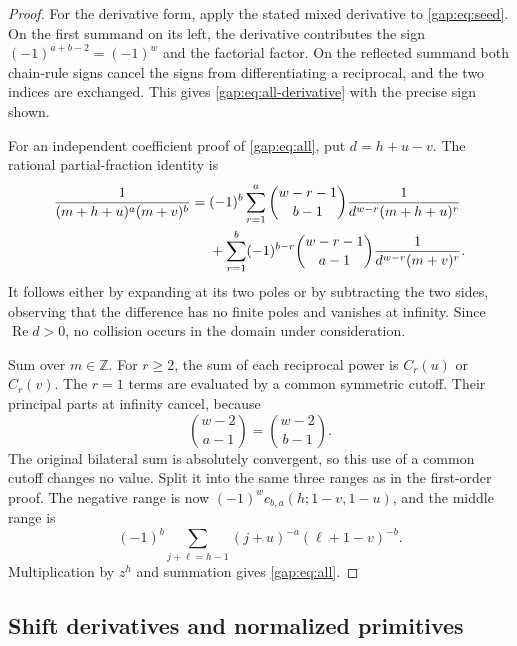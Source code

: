 \documentclass[11pt,letterpaper]{article}
\numberwithin{equation}{section}
\theoremstyle{plain}
\theoremstyle{definition}
\theoremstyle{remark}
\begin{document}
\begin{proof}
For the derivative form, apply the stated mixed derivative to
\eqref{gap:eq:seed}. On the first summand on its left, the derivative
contributes the sign $(-1)^{a+b-2}=(-1)^w$ and the factorial factor.
On the reflected summand both chain-rule signs cancel the signs
from differentiating a reciprocal, and the two indices are exchanged.
This gives \eqref{gap:eq:all-derivative} with the precise sign shown.

For an independent coefficient proof of \eqref{gap:eq:all}, put
$d=h+u-v$. The rational partial-fraction identity is
\begin{align}
 \frac1{(m+h+u)^a(m+v)^b}
 ={}&(-1)^b\sum_{r=1}^{a}
  \binom{w-r-1}{b-1}\frac1{d^{w-r}(m+h+u)^r}\notag\\
 &+\sum_{r=1}^{b}(-1)^{b-r}
  \binom{w-r-1}{a-1}\frac1{d^{w-r}(m+v)^r}.
 \label{gap:eq:pf}
\end{align}
It follows either by expanding at its two poles or by subtracting
the two sides, observing that the difference has no finite poles and
vanishes at infinity. Since $\operatorname{Re}d>0$, no collision occurs
in the domain under consideration.

Sum over $m\in\mathbb Z$. For $r\geq2$, the sum of each reciprocal
power is $C_r(u)$ or $C_r(v)$. The $r=1$ terms are evaluated by a
common symmetric cutoff. Their principal parts at infinity cancel,
because
\[
 \binom{w-2}{a-1}=\binom{w-2}{b-1}.
\]
The original bilateral sum is absolutely convergent, so this use of
a common cutoff changes no value. Split it into the same three ranges
as in the first-order proof. The negative range is now
$(-1)^w c_{b,a}(h;1-v,1-u)$, and the middle range is
\[
 (-1)^b\sum_{j+\ell=h-1}
      (j+u)^{-a}(\ell+1-v)^{-b}.
\]
Multiplication by $z^h$ and summation gives
\eqref{gap:eq:all}.
\end{proof}

\subsection{Shift derivatives and normalized primitives}
\end{document}
